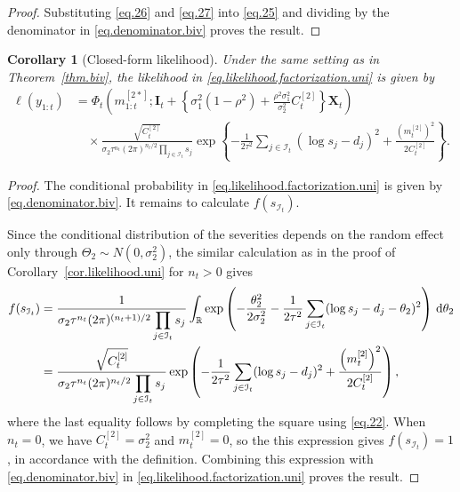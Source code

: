 \documentclass[11pt,authoryear]{elsarticle}
\def\Real{\mathbb{R}}
\newtheorem{corollary}{Corollary}
\theoremstyle{nopunct}
\numberwithin{equation}{section}
\begin{document}
\begin{proof}
Substituting \eqref{eq.26} and \eqref{eq.27} into \eqref{eq.25}
and dividing by the denominator in \eqref{eq.denominator.biv}
proves the result.
\end{proof}





\begin{corollary}[Closed-form likelihood]
\label{cor2.1}
Under the same setting as in Theorem~\ref{thm.biv}, the likelihood
in \eqref{eq.likelihood.factorization.uni} is given by
\[
\begin{aligned}
\ell(y_{1:t})
&=
\Phi_t
\left(
m_{1:t}^{[2*]};
\boldsymbol I_t
+
\left\{
\sigma_1^2(1-\rho^2)
+
\frac{\rho^2\sigma_1^2}{\sigma_2^2}C_t^{[2]}
\right\}
\boldsymbol X_t
\right)\\
&\quad\times
\frac{\sqrt{C_t^{[2]}}}
{\sigma_2\tau^{n_t}(2\pi)^{n_t/2}
\displaystyle\prod_{j\in\mathcal I_t}s_j}
\exp\left\{
-\frac{1}{2\tau^2}
\sum_{j\in\mathcal I_t}
(\log s_j-d_j)^2
+
\frac{\left(m_t^{[2]}\right)^2}{2C_t^{[2]}}
\right\}.
\end{aligned}
\]
\end{corollary}


\begin{proof}
The conditional probability in \eqref{eq.likelihood.factorization.uni}
is given by \eqref{eq.denominator.biv}.
It remains to calculate \(f(s_{\mathcal I_t})\).

Since the conditional distribution of the severities depends on
the random effect only through \(\Theta_2\sim N(0,\sigma_2^2)\), 
the similar calculation as in the proof of Corollary~\ref{cor.likelihood.uni} for \(n_t>0\) gives 
\[
\begin{aligned}
f(s_{\mathcal I_t})
&=
\frac{1}
{\sigma_2\tau^{n_t}(2\pi)^{(n_t+1)/2}
\displaystyle\prod_{j\in\mathcal I_t}s_j}
\int_{\Real}
\exp\left(
-\frac{\theta_2^2}{2\sigma_2^2}
-\frac{1}{2\tau^2}
\sum_{j\in\mathcal I_t}
(\log s_j-d_j-\theta_2)^2
\right)
\,{\rm d}\theta_2\\
&=
\frac{\sqrt{C_t^{[2]}}}
{\sigma_2\tau^{n_t}(2\pi)^{n_t/2}
\displaystyle\prod_{j\in\mathcal I_t}s_j}
\exp\left(
-\frac{1}{2\tau^2}
\sum_{j\in\mathcal I_t}
(\log s_j-d_j)^2
+
\frac{\left(m_t^{[2]}\right)^2}{2C_t^{[2]}}
\right),
\end{aligned}
\]
where the last equality follows by completing the square using
\eqref{eq.22}. 
When \(n_t=0\), we have \(C_t^{[2]}=\sigma_2^2\) and
\(m_t^{[2]}=0\), so the this expression gives
\(f(s_{\mathcal I_t})=1\), in accordance with the definition.
Combining this expression with \eqref{eq.denominator.biv}
in \eqref{eq.likelihood.factorization.uni} proves the result.
\end{proof}
\end{document}
